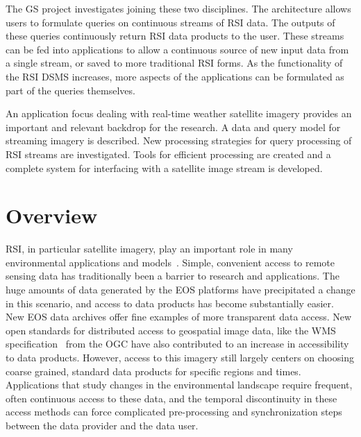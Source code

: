 \documentclass{ucdthesis}       %
\begin{document}
\begin{frontmatter}
\begin{inlineabstract}
  The \ac{GS} project investigates joining these two disciplines.  The
  architecture allows users to formulate queries on continuous streams
  of \ac{RSI} data.  The outputs of these queries continuously return
  \ac{RSI} data products to the user.  These streams can be fed into
  applications to allow a continuous source of new input data from a
  single stream, or saved to more traditional \ac{RSI} forms.  As the
  functionality of the \ac{RSI} \ac{DSMS} increases, more aspects of
  the applications can be formulated as part of the queries
  themselves.

  An application focus dealing with real-time weather satellite
  imagery provides an important and relevant backdrop for the
  research.  A data and query model for streaming imagery is
  described.  New processing strategies for query processing of
  \ac{RSI} streams are investigated.  Tools for efficient processing
  are created and a complete system for interfacing with a satellite
  image stream is developed.
\end{inlineabstract}
\acresetall


\end{frontmatter}


\chapter{Overview}
\label{cha:overview}

\acf{RSI}, in particular satellite imagery, play an important role in
many environmental applications and models~\cite{skidm02envir-model}.
Simple, convenient access to remote sensing data has traditionally
been a barrier to research and applications.  The huge amounts of data
generated by the \ac{EOS} platforms have precipitated a change in this
scenario, and access to data products has become substantially easier.
New \ac{EOS} data archives offer fine examples of more transparent
data access.  New open standards for distributed access to geospatial
image data, like the \acf{WMS} specification~\cite{openg04web-map}
from the \acf{OGC} have also contributed to an increase in
accessibility to data products.  However, access to this imagery still
largely centers on choosing coarse grained, standard data products for
specific regions and times.  Applications that study changes in the
environmental landscape require frequent, often continuous access to
these data, and the temporal discontinuity in these access methods can
force complicated pre-processing and synchronization steps between the
data provider and the data user.
\end{document}
